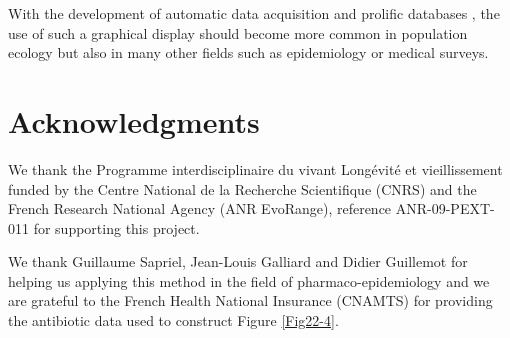 With the development of automatic data acquisition and prolific databases
\autocites{le-galliard2012a,mallard2012a,mallard2013a}, the use of such a
graphical display should become more common in population ecology but also in many other fields such as epidemiology or medical
surveys.

\section{Acknowledgments}

We thank the Programme interdisciplinaire du vivant Longévité et vieillissement
funded by the Centre National de la Recherche Scientifique (CNRS) and the French
Research National Agency (ANR EvoRange), reference ANR-09-PEXT-011 for
supporting this project.

We thank Guillaume Sapriel, Jean-Louis Galliard and Didier Guillemot for helping
us applying this method in the field of pharmaco-epidemiology and we are
grateful to the French Health National Insurance (CNAMTS) for providing the
antibiotic data used to construct Figure \ref{Fig22-4}.